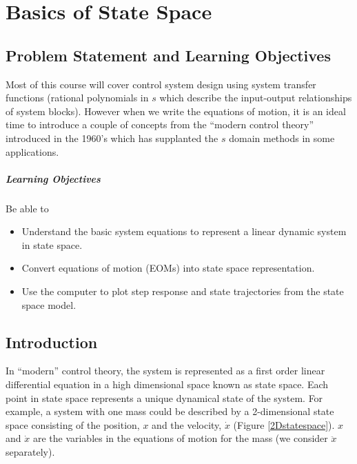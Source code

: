 

\chapter{Basics of State Space}\label{BasicsStateSpaceChapter}


\section{Problem Statement and Learning Objectives}

Most of this course will cover control system design using system transfer functions (rational polynomials in $s$ which describe the input-output relationships of system blocks).  However when we write the equations of motion, it is an ideal time to introduce a couple of concepts from the ``modern control theory'' introduced in the 1960's which has supplanted the $s$ domain methods in some applications.

\paragraph{Learning Objectives}
Be able to
\begin{itemize}
    \item Understand the basic system equations to represent a linear
    dynamic system in state space.
    \item Convert equations of motion (EOMs) into state space
    representation.
    \item Use the computer to plot step response and state trajectories from
    the state space model.
\end{itemize}

\section{Introduction}\label{SSeomIntro}
In ``modern'' control theory, the system is represented as a first order linear differential equation in a high dimensional space known as state space.  Each point in state space represents a unique dynamical state of the system.   For example, a system with one mass could be described by a 2-dimensional state space consisting of the position, $x$ and the velocity, $\dot{x}$ (Figure \ref{2Dstatespace}). $x$ and
$\dot{x}$
are the variables in the equations of motion for the mass (we consider $\ddot{x}$
separately).

